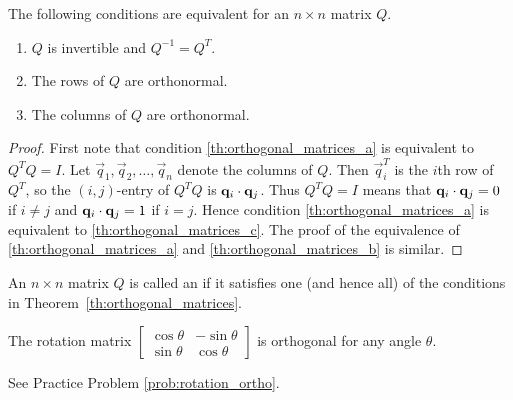 \documentclass{ximera}
\begin{document}
\begin{theorem}\label{th:orthogonal_matrices}
The following conditions are equivalent for an $n \times n$ matrix $Q$.

\begin{enumerate}
\item\label{th:orthogonal_matrices_a} $Q$ is invertible and $Q^{-1} = Q^{T}$.

\item\label{th:orthogonal_matrices_b} The rows of $Q$ are orthonormal.

\item\label{th:orthogonal_matrices_c} The columns of $Q$ are orthonormal.

\end{enumerate}
\end{theorem}

\begin{proof}
First note that condition \ref{th:orthogonal_matrices_a} is equivalent to $Q^{T}Q = I$. Let $\vec{q}_{1}, \vec{q}_{2}, \dots, \vec{q}_{n}$ denote the columns of $Q$. Then $\vec{q}_{i}^{T}$ is the $i$th row of $Q^{T}$, so the $(i, j)$-entry of $Q^{T}Q$ is $\mathbf{q}_{i} \cdot \mathbf{q}_{j}$. Thus $Q^{T}Q = I$ means that $\mathbf{q}_{i} \cdot \mathbf{q}_{j} = 0$ if $i \neq j$ and $\mathbf{q}_{i} \cdot \mathbf{q}_{j} = 1$ if $i = j$. Hence condition \ref{th:orthogonal_matrices_a} is equivalent to \ref{th:orthogonal_matrices_c}. The proof of the equivalence of \ref{th:orthogonal_matrices_a} and \ref{th:orthogonal_matrices_b} is similar.
\end{proof}

\begin{definition}\label{def:orthogonal matrices}
An $n \times n$ matrix $Q$ is called an  if it satisfies one (and hence all) of the conditions in Theorem~\ref{th:orthogonal_matrices}.
\end{definition}


\begin{example}\label{ex:rotation_ortho}
The rotation matrix
$\begin{bmatrix}
\cos\theta & -\sin\theta \\
\sin\theta & \cos\theta
\end{bmatrix}$ is orthogonal for any angle $\theta$.
\begin{explanation}
See Practice Problem \ref{prob:rotation_ortho}.
\end{explanation}
\end{example}
\end{document}
